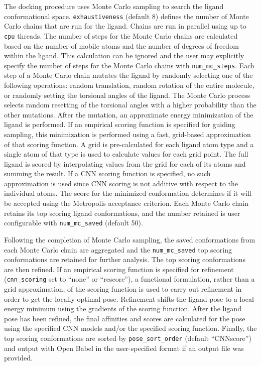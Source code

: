 \documentclass[linenumbers,doublespacing]{bmcart}
\begin{document}
The docking procedure uses Monte Carlo sampling to search the ligand conformational space. \texttt{exhaustiveness} (default 8) defines the number of Monte Carlo chains that are run for the ligand. Chains are run in parallel using up to \texttt{cpu} threads. The number of steps for the Monte Carlo chains are calculated based on the number of mobile atoms and the number of degrees of freedom within the ligand. This calculation can be ignored and the user may explicitly specify the number of steps for the Monte Carlo chains with \texttt{num\_mc\_steps}. Each step of a Monte Carlo chain mutates the ligand by randomly selecting one of the following operations: random translation, random rotation of the entire molecule, or randomly setting the torsional angles of the ligand. The Monte Carlo process selects random resetting of the torsional angles with a higher probability than the other mutations. After the mutation, an approximate energy minimization of the ligand is performed. If an empirical scoring function is specified for guiding sampling, this minimization is performed using a fast, grid-based approximation of that scoring function. A grid is pre-calculated for each ligand atom type and a single atom of that type is used to calculate values for each grid point.  The full ligand is scored by interpolating values from the grid for each of its atoms and summing the result.  If a CNN scoring function is specified, no such approximation is used since CNN scoring is not additive with respect to the individual atoms\cite{hochuli2018visualizing}.
 The score for the minimized conformation determines if it will be accepted using the Metropolis acceptance criterion. Each Monte Carlo chain retains its top scoring ligand conformations, and the number retained is user configurable with \texttt{num\_mc\_saved} (default 50).

Following the completion of Monte Carlo sampling, the saved conformations from each Monte Carlo chain are aggregated and the \texttt{num\_mc\_saved} top scoring conformations are retained for further analysis. The top scoring conformations are then refined. If an empirical scoring function is specified for refinement (\texttt{cnn\_scoring} set to ``none'' or ``rescore''), a functional formulation, rather than a grid approximation, of the scoring function is used to carry out refinement in order to get the locally optimal pose. Refinement shifts the ligand pose to a local energy minimum using the gradients of the scoring function. After the ligand pose has been refined, the final affinities and scores are calculated for the pose using the specified CNN models and/or the specified scoring function. Finally, the top scoring conformations are sorted by \texttt{pose\_sort\_order} (default ``CNNscore'') and output with Open Babel in the user-specified format if an output file was provided.
\end{document}
